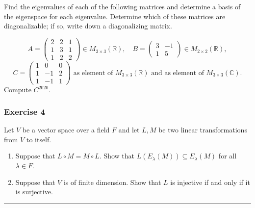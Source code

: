 \documentclass[
  12pt,
  a4paper,
  twoside]{article}
\theoremstyle{plain}
\theoremstyle{definition}
\begin{document}
Find the eigenvalues of each of the following matrices and
determine a basis of the eigenspace for each eigenvalue. Determine
which of these matrices are diagonalizable; if so, write down a
diagonalizing matrix.

\[A= \left(\begin{array}{ccc} 2 & 2 & 1\\ 1&3&1\\1&2&2
\end{array}\right) \in M_{3 \times 3}(\mathbb{R}), \quad B=
\left(\begin{array}{cc}3&-1\\1&5\end{array}\right) \in M_{2 \times
2}(\mathbb{R}),\]
\[C=\left(\begin{array}{ccc}1&0&0\\1&-1&2\\1&-1&1\end{array}\right)
\textrm{ as element of } M_{3 \times 3}(\mathbb{R}) \textrm{ and as
element of } M_{3 \times 3}(\mathbb{C}).\] Compute \(C^{2020}\).

\hypertarget{exercise-4-6}{%
\subsubsection*{Exercise 4}\label{exercise-4-6}}

Let \(V\) be a vector space over a field \(F\) and let \(L, M\) be two
linear transformations from \(V\) to itself.

\begin{enumerate}
\def\labelenumi{(\alph{enumi})}
\item
  Suppose that \(L \circ M = M \circ L\). Show that
  \(L(E_\lambda(M)) \subseteq E_\lambda(M)\) for all \(\lambda \in F\).
\item
  Suppose that \(V\) is of finite dimension. Show that \(L\) is
  injective if and only if it is surjective.
\end{enumerate}

\begin{center}\rule{0.5\linewidth}{0.5pt}\end{center}
\end{document}
